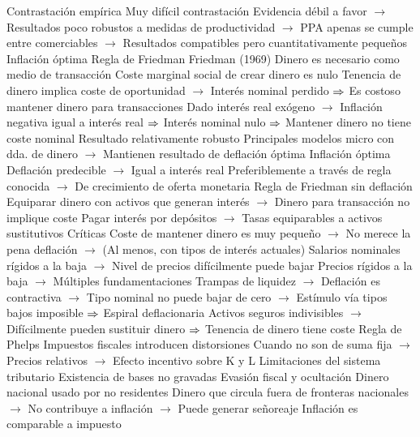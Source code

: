 \documentclass{nuevotema}
\begin{document}
\begin{esquemal}
				\4 Contrastación empírica
				\4[] Muy difícil contrastación
				\4[] Evidencia débil a favor
				\4[] $\to$ Resultados poco robustos a medidas de productividad
				\4[] $\to$ PPA apenas se cumple entre comerciables
				\4[] $\to$ Resultados compatibles pero cuantitativamente pequeños
		\2 Inflación óptima
			\3 Regla de Friedman
				\4 Friedman (1969)
				\4[] Dinero es necesario como medio de transacción
				\4[] Coste marginal social de crear dinero es nulo
				\4[] Tenencia de dinero implica coste de oportunidad
				\4[] $\to$ Interés nominal perdido
				\4[] $\Rightarrow$ Es costoso mantener dinero para transacciones
				\4[] Dado interés real exógeno
				\4[] $\to$ Inflación negativa igual a interés real
				\4[] $\Rightarrow$ Interés nominal nulo
				\4[] $\Rightarrow$ Mantener dinero no tiene coste nominal
				\4 Resultado relativamente robusto
				\4[] Principales modelos micro con dda. de dinero
				\4[] $\to$ Mantienen resultado de deflación óptima
				\4 Inflación óptima
				\4[] Deflación predecible
				\4[] $\to$ Igual a interés real
				\4[] Preferiblemente a través de regla conocida
				\4[] $\to$ De crecimiento de oferta monetaria
				\4 Regla de Friedman sin deflación
				\4[] Equiparar dinero con activos que generan interés
				\4[] $\to$ Dinero para transacción no implique coste
				\4[] Pagar interés por depósitos
				\4[] $\to$ Tasas equiparables a activos sustitutivos
				\4 Críticas
				\4[] Coste de mantener dinero es muy pequeño
				\4[] $\to$ No merece la pena deflación
				\4[] $\to$ (Al menos, con tipos de interés actuales)
				\4[] Salarios nominales rígidos a la baja
				\4[] $\to$ Nivel de precios difícilmente puede bajar
				\4[] Precios rígidos a la baja
				\4[] $\to$ Múltiples fundamentaciones
				\4[] Trampas de liquidez
				\4[] $\to$ Deflación es contractiva
				\4[] $\to$ Tipo nominal no puede bajar de cero
				\4[] $\to$ Estímulo vía tipos bajos imposible
				\4[] $\Rightarrow$ Espiral deflacionaria
				\4[] Activos seguros indivisibles
				\4[] $\to$ Difícilmente pueden sustituir dinero
				\4[] $\Rightarrow$ Tenencia de dinero tiene coste
			\3 Regla de Phelps
				\4 Impuestos fiscales introducen distorsiones
				\4[] Cuando no son de suma fija
				\4[] $\to$ Precios relativos
				\4[] $\to$ Efecto incentivo sobre K y L
				\4 Limitaciones del sistema tributario
				\4[] Existencia de bases no gravadas
				\4[] Evasión fiscal y ocultación
				\4 Dinero nacional usado por no residentes
				\4[] Dinero que circula fuera de fronteras nacionales
				\4[] $\to$ No contribuye a inflación
				\4[] $\to$ Puede generar señoreaje
				\4 Inflación es comparable a impuesto

\end{esquemal}
\end{document}

